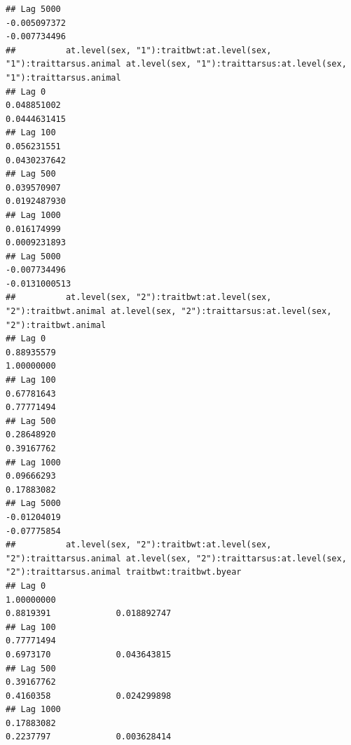 \documentclass[
  12pt,
]{book}
\begin{document}
\begin{verbatim}
## Lag 5000                                                   -0.005097372                                                      -0.007734496
##          at.level(sex, "1"):traitbwt:at.level(sex, "1"):traittarsus.animal at.level(sex, "1"):traittarsus:at.level(sex, "1"):traittarsus.animal
## Lag 0                                                          0.048851002                                                         0.0444631415
## Lag 100                                                        0.056231551                                                         0.0430237642
## Lag 500                                                        0.039570907                                                         0.0192487930
## Lag 1000                                                       0.016174999                                                         0.0009231893
## Lag 5000                                                      -0.007734496                                                        -0.0131000513
##          at.level(sex, "2"):traitbwt:at.level(sex, "2"):traitbwt.animal at.level(sex, "2"):traittarsus:at.level(sex, "2"):traitbwt.animal
## Lag 0                                                        0.88935579                                                        1.00000000
## Lag 100                                                      0.67781643                                                        0.77771494
## Lag 500                                                      0.28648920                                                        0.39167762
## Lag 1000                                                     0.09666293                                                        0.17883082
## Lag 5000                                                    -0.01204019                                                       -0.07775854
##          at.level(sex, "2"):traitbwt:at.level(sex, "2"):traittarsus.animal at.level(sex, "2"):traittarsus:at.level(sex, "2"):traittarsus.animal traitbwt:traitbwt.byear
## Lag 0                                                           1.00000000                                                            0.8819391             0.018892747
## Lag 100                                                         0.77771494                                                            0.6973170             0.043643815
## Lag 500                                                         0.39167762                                                            0.4160358             0.024299898
## Lag 1000                                                        0.17883082                                                            0.2237797             0.003628414

\end{verbatim}
\end{document}
